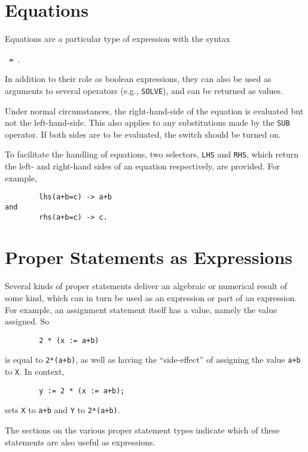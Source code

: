 \section{Equations}

Equations are a particular type of expression with the syntax
\begin{syntax}
      \texttt{ = }.
\end{syntax}
In addition to their role as boolean expressions, they can also be used as
arguments to several operators (e.g., \texttt{SOLVE}), and can be
returned as values.

\hypertarget{switch:EVALLHSEQP}{}
Under normal circumstances, the right-hand-side of the equation is
evaluated but not the left-hand-side.  This also applies to any substitutions
made by the \texttt{SUB} operator.  If both sides are to be
evaluated, the switch  should be
turned on.

\hypertarget{operator:LHS}{}
\hypertarget{operator:RHS}{}
To facilitate the handling of equations, two selectors, \texttt{LHS}
 and \texttt{RHS}, which return the left- and
right-hand sides of an equation respectively, are provided.
For example,
\begin{verbatim}
        lhs(a+b=c) -> a+b
and
        rhs(a+b=c) -> c.
\end{verbatim}

\section{Proper Statements as Expressions}

Several kinds of proper statements deliver
an algebraic or numerical result of some kind, which can in turn be used as
an expression or part of an expression.  For example, an assignment
statement itself has a value, namely the value assigned.  So
\begin{verbatim}
        2 * (x := a+b)
\end{verbatim}
is equal to \texttt{2*(a+b)}, as well as having the ``side-effect'' of assigning the value \texttt{a+b} to \texttt{X}.  In context,
\begin{verbatim}
        y := 2 * (x := a+b);
\end{verbatim}
sets \texttt{X} to \texttt{a+b} and \texttt{Y} to \texttt{2*(a+b)}.

The sections on the various proper statement types
indicate which of these statements are also useful as expressions.

